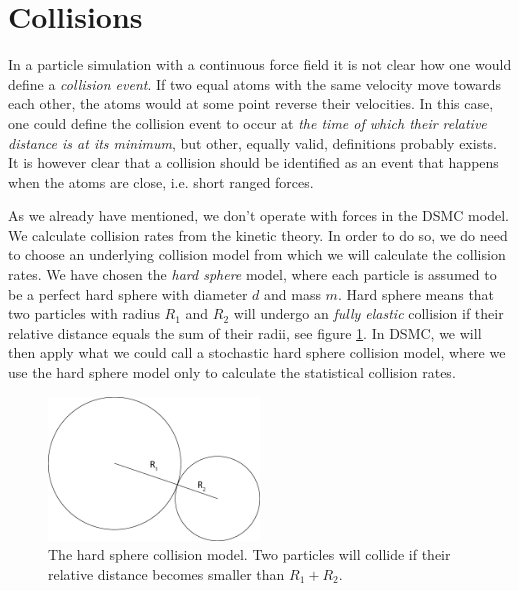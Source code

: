 \section{Collisions}
\label{sec:dsmc_collisions_model}
In a particle simulation with a continuous force field it is not clear how one would define a \textit{collision event}. If two equal atoms with the same velocity move towards each other, the atoms would at some point reverse their velocities. In this case, one could define the collision event to occur at \textit{the time of which their relative distance is at its minimum}, but other, equally valid, definitions probably exists. It is however clear that a collision should be identified as an event that happens when the atoms are close, i.e. short ranged forces.

As we already have mentioned, we don't operate with forces in the DSMC model. We calculate collision rates from the kinetic theory. In order to do so, we do need to choose an underlying collision model from which we will calculate the collision rates. We have chosen the \textit{hard sphere} model, where each particle is assumed to be a perfect hard sphere with diameter $d$ and mass $m$. Hard sphere means that two particles with radius $R_1$ and $R_2$ will undergo an \textit{fully elastic} collision if their relative distance equals the sum of their radii, see figure \ref{fig:dsmc_hard_sphere}. In DSMC, we will then apply what we could call a stochastic hard sphere collision model, where we use the hard sphere model only to calculate the statistical collision rates.
\begin{figure}[h]
\begin{center}
\includegraphics[width=0.5\textwidth, trim=0cm 0cm 0cm 0cm, clip]{DSMC/figures/collisions.eps}
\end{center}
\caption{The hard sphere collision model. Two particles will collide if their relative distance becomes smaller than $R_1+R_2$.}
\label{fig:dsmc_hard_sphere}
\end{figure}

